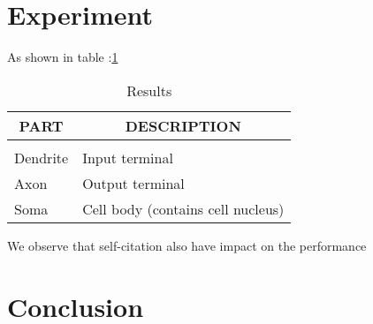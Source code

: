 \documentclass{article} %
\begin{document}
\section{Experiment}
As shown in table :\ref{results-table}
\begin{table}[t]
\caption{Results}
\label{results-table}
\begin{center}
\begin{tabular}{ll}
\multicolumn{1}{c}{\bf PART}  &\multicolumn{1}{c}{\bf DESCRIPTION}
\\ \hline \\
Dendrite         &Input terminal \\
Axon             &Output terminal \\
Soma             &Cell body (contains cell nucleus) \\
\end{tabular}
\end{center}
\end{table}

We observe that self-citation also have impact on the performance

\section{Conclusion}



\nocite{*}
\end{document}

